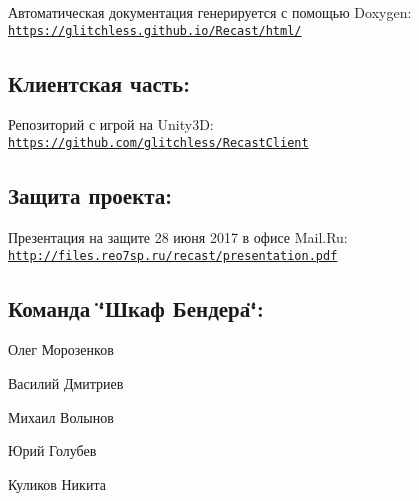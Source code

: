 Автоматическая документация генерируется с помощью Doxygen\-: \href{https://glitchless.github.io/Recast/html/}{\tt https\-://glitchless.\-github.\-io/\-Recast/html/}

\subsection*{Клиентская часть\-:}

Репозиторий с игрой на Unity3\-D\-: \href{https://github.com/glitchless/RecastClient}{\tt https\-://github.\-com/glitchless/\-Recast\-Client}

\subsection*{Защита проекта\-:}

Презентация на защите 28 июня 2017 в офисе Mail.\-Ru\-: \href{http://files.reo7sp.ru/recast/presentation.pdf}{\tt http\-://files.\-reo7sp.\-ru/recast/presentation.\-pdf}

\subsection*{Команда \char`\"{}Шкаф Бендера\char`\"{}\-:}


\begin{DoxyItemize}
\item Олег Морозенков
\item Василий Дмитриев
\item Михаил Волынов
\item Юрий Голубев
\item Куликов Никита 
\end{DoxyItemize}